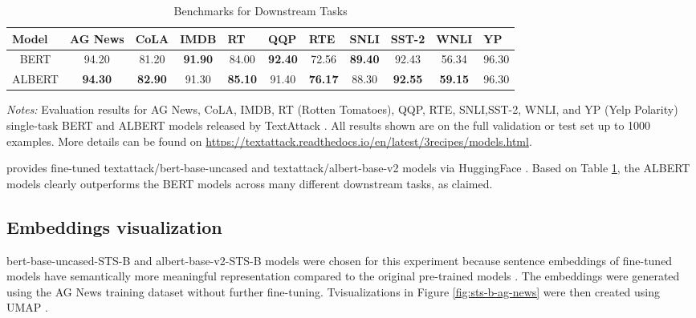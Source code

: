 \documentclass{article}
\begin{document}
\begin{table}[!htbp]
\centering
\begin{threeparttable}[b]
\caption{Benchmarks for Downstream Tasks}
\begin{tabular}{ccccccccccc}
\hline
\multicolumn{1}{l}{Model} &
  \multicolumn{1}{l}{AG News} &
  \multicolumn{1}{l}{CoLA} &
  \multicolumn{1}{l}{IMDB} &
  \multicolumn{1}{l}{RT} &
  \multicolumn{1}{l}{QQP} &
  \multicolumn{1}{l}{RTE} &
  \multicolumn{1}{l}{SNLI} &
  \multicolumn{1}{l}{SST-2} &
  \multicolumn{1}{l}{WNLI} &
  \multicolumn{1}{l}{YP} \\ \hline
BERT     & 94.20          & 81.20          & \textbf{91.90} & 84.00          & \textbf{92.40} & 72.56          & \textbf{89.40} & 92.43          & 56.34          & 96.30 \\
ALBERT   & \textbf{94.30} & \textbf{82.90} & 91.30          & \textbf{85.10} & 91.40          & \textbf{76.17} & 88.30          & \textbf{92.55} & \textbf{59.15} & 96.30 \\
\hline
\end{tabular}
\begin{tablenotes}[flushleft]
\footnotesize 
\item \textit{Notes:} Evaluation results for AG News, CoLA, IMDB, RT (Rotten Tomatoes), QQP, RTE, SNLI,SST-2, WNLI, and YP (Yelp Polarity) single-task BERT and ALBERT models released by TextAttack \cite{Morris2020TextAttackAF}. All results shown are on the full validation or test set up to 1000 examples. More details can be found on \url{https://textattack.readthedocs.io/en/latest/3recipes/models.html}.
\end{tablenotes}
\end{threeparttable}
\label{tab:TextAttack-models-evaluation-results}
\end{table}

\citet{Morris2020TextAttackAF} provides fine-tuned textattack/bert-base-uncased and textattack/albert-base-v2 models via HuggingFace \cite{Wolf2019HuggingFacesTS}. Based on Table \ref{tab:TextAttack-models-evaluation-results}, the ALBERT models clearly outperforms the BERT models across many different downstream tasks, as \citet{Lan2020ALBERT} claimed. 


\subsection{Embeddings visualization}

bert-base-uncased-STS-B and albert-base-v2-STS-B models were chosen for this experiment because sentence embeddings of fine-tuned models have semantically more meaningful representation compared to the original pre-trained models \cite{devlin-etal-2019-bert} \cite{reimers-gurevych-2019-sentence} \cite{Rogers2020API}. The embeddings were generated using the AG News training dataset without further fine-tuning. Tvisualizations in Figure \ref{fig:sts-b-ag-news} were then created using UMAP \cite{McInnes2018UMAPUM}.
\end{document}
